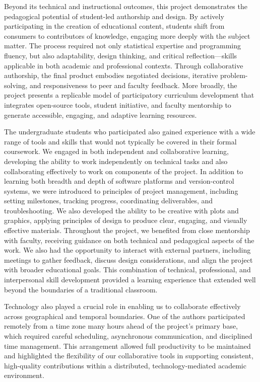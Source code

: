 \documentclass[11pt]{article}
\begin{document}
Beyond its technical and instructional outcomes, this project demonstrates the pedagogical potential of student-led authorship and design. By actively participating in the creation of educational content, students shift from consumers to contributors of knowledge, engaging more deeply with the subject matter.
The process required not only statistical expertise and programming fluency, but also adaptability, design thinking, and critical reflection—skills applicable in both academic and professional contexts. Through collaborative authorship, the final product embodies negotiated decisions, iterative problem-solving, and responsiveness to peer and faculty feedback.
More broadly, the project presents a replicable model of participatory curriculum development that integrates open-source tools, student initiative, and faculty mentorship to generate accessible, engaging, and adaptive learning resources.

The undergraduate students who participated also gained experience with a wide range of tools and skills that would not typically be covered in their formal coursework.
We engaged in both independent and collaborative learning, developing the ability to work independently on technical tasks and also collaborating effectively to work on components of the project.
In addition to learning both breadth and depth of software platforms and version-control systems, we were introduced to principles of project management, including setting milestones, tracking progress, coordinating deliverables, and troubleshooting.
We also developed the ability to be creative with plots and graphics, applying principles of design to produce clear, engaging, and visually effective materials.
Throughout the project, we benefited from close mentorship with faculty, receiving guidance on both technical and pedagogical aspects of the work.
We also had the opportunity to interact with external partners, including meetings to gather feedback, discuss design considerations, and align the project with broader educational goals.
This combination of technical, professional, and interpersonal skill development provided a learning experience that extended well beyond the boundaries of a traditional classroom.

Technology also played a crucial role in enabling us to collaborate effectively across geographical and temporal boundaries. One of the authors participated remotely from a time zone many hours ahead of the project’s primary base, which required careful scheduling, asynchronous communication, and disciplined time management. This arrangement allowed full productivity to be maintained and highlighted the flexibility of our collaborative tools in supporting consistent, high-quality contributions within a distributed, technology-mediated academic environment.
\end{document}
